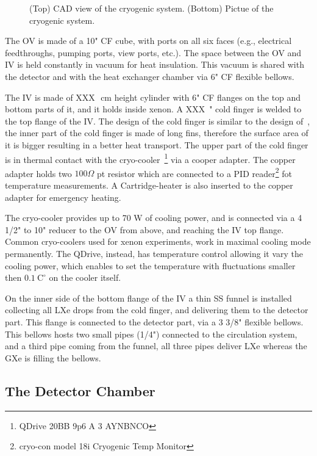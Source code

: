 \begin{figure}
\begin{subfigure}[b]{0.25\textheight}
    \end{subfigure}
    \caption{(Top) CAD view of the cryogenic system. (Bottom) Pictue of the cryogenic system. \label{fig:cryo}}
\end{figure}


The OV is made of a 10" CF cube, with ports on all six faces (e.g., electrical feedthroughs, pumping ports, view ports, etc.). The space between the OV and IV is held constantly in vacuum for heat insulation. This vacuum is shared with the detector and with the heat exchanger chamber via 6" CF flexible bellows.

The IV is made of XXX~\,cm height cylinder with 6" CF flanges on the top and bottom parts of it, and it holds inside xenon. A XXX~" cold finger is welded to the top flange of the IV. The design of the cold finger is similar to the design of~\cite{xe100_instr2012}, the inner part of the cold finger is made of long fins, therefore the surface area of it is bigger resulting in a better heat transport. The upper part of the cold finger is in thermal contact with the cryo-cooler~\footnote{QDrive 20BB 9p6 A 3 AYNBNCO} via a cooper adapter. The copper adapter holds two $100\Omega$ pt resistor which are connected to a PID reader\footnote{cryo-con model 18i Cryogenic Temp Monitor} fot temperature measurements. A Cartridge-heater is also inserted to the copper adapter for emergency heating. 

The cryo-cooler provides up to 70 W of cooling power, and is connected via a 4 1/2" to 10" reducer to the OV from above, and reaching the IV top flange. Common cryo-coolers used for xenon experiments, work in maximal cooling mode permanently. The QDrive, instead, has temperature control allowing it vary the cooling power, which enables to set the temperature with fluctuations smaller then $0.1~\mathrm{C^{\circ}}$ on the cooler itself.

On the inner side of the bottom flange of the IV a thin SS funnel is installed collecting all LXe drops from the cold finger, and delivering them to the  detector part. This flange is connected to the detector part, via a 3 3/8" flexible bellows. This bellows hosts two small pipes (1/4") connected to the circulation system, and a third pipe coming from the funnel, all three pipes deliver LXe whereas the GXe is filling the bellows.

\subsection{The Detector Chamber}
\label{subsec:det}

